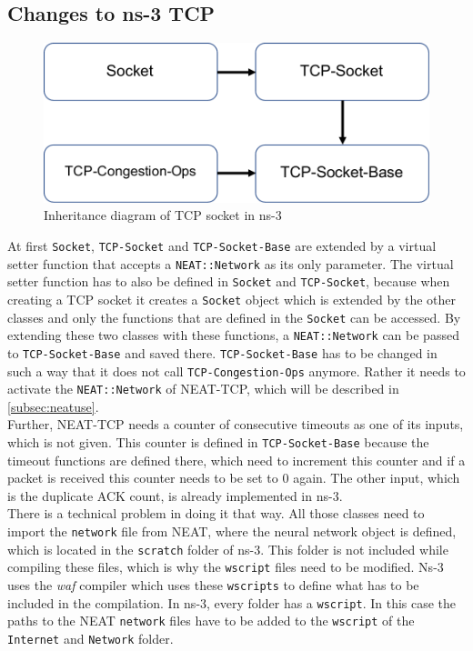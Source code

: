 \subsection{Changes to ns-3 TCP}
\begin{figure}[h]
	\centering
	\includegraphics[width=1\linewidth]{Tcp-Socket}
	\caption{Inheritance diagram of TCP socket in ns-3}
	\label{fig:TcpSocket}
\end{figure}
At first \texttt{Socket}, \texttt{TCP-Socket} and \texttt{TCP-Socket-Base} are extended by a virtual setter function that accepts a \texttt{NEAT::Network} as its only parameter. The virtual setter function has to also be defined in \texttt{Socket} and \texttt{TCP-Socket}, because when creating a TCP socket it creates a \texttt{Socket} object which is extended by the other classes and only the functions that are defined in the \texttt{Socket} can be accessed. By extending these two classes with these functions, a \texttt{NEAT::Network} can be passed to \texttt{TCP-Socket-Base} and saved there. \texttt{TCP-Socket-Base} has to be changed in such a way that it does not call \texttt{TCP-Congestion-Ops} anymore. Rather it needs to activate the \texttt{NEAT::Network} of NEAT-TCP, which will be described in \autoref{subsec:neatuse}. \\ Further, NEAT-TCP needs a counter of consecutive timeouts as one of its inputs, which is not given. This counter is defined in \texttt{TCP-Socket-Base} because the timeout functions are defined there, which need to increment this counter and if a packet is received this counter needs to be set to 0 again. The other input, which is the duplicate ACK count, is already implemented in ns-3.\\
There is a technical problem in doing it that way. All those classes need to import the \texttt{network} file from NEAT, where the neural network object is defined, which is located in the \texttt{scratch} folder of ns-3. This folder is not included while compiling these files, which is why the \texttt{wscript} files need to be modified. Ns-3 uses the \textit{waf} compiler which uses these \texttt{wscripts} to define what has to be included in the compilation. In ns-3, every folder has a \texttt{wscript}. In this case the paths to the NEAT \texttt{network} files have to be added to the \texttt{wscript} of the \texttt{Internet} and \texttt{Network} folder.


